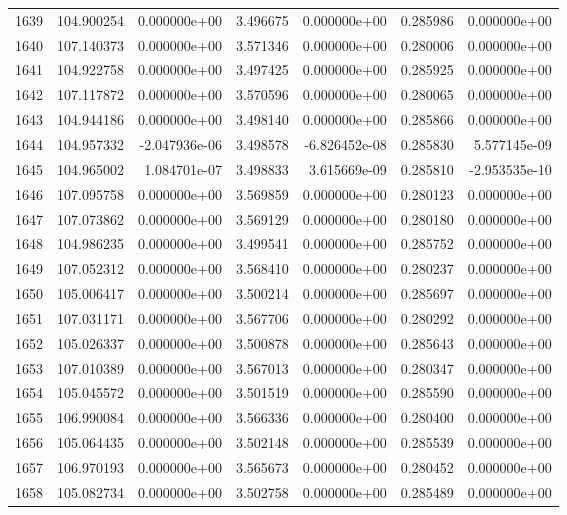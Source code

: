 \begin{tabular}{rrrrrrr}
1639 & 104.900254 &  0.000000e+00 &  3.496675 &  0.000000e+00 &    0.285986 &  0.000000e+00 \\
1640 & 107.140373 &  0.000000e+00 &  3.571346 &  0.000000e+00 &    0.280006 &  0.000000e+00 \\
1641 & 104.922758 &  0.000000e+00 &  3.497425 &  0.000000e+00 &    0.285925 &  0.000000e+00 \\
1642 & 107.117872 &  0.000000e+00 &  3.570596 &  0.000000e+00 &    0.280065 &  0.000000e+00 \\
1643 & 104.944186 &  0.000000e+00 &  3.498140 &  0.000000e+00 &    0.285866 &  0.000000e+00 \\
1644 & 104.957332 & -2.047936e-06 &  3.498578 & -6.826452e-08 &    0.285830 &  5.577145e-09 \\
1645 & 104.965002 &  1.084701e-07 &  3.498833 &  3.615669e-09 &    0.285810 & -2.953535e-10 \\
1646 & 107.095758 &  0.000000e+00 &  3.569859 &  0.000000e+00 &    0.280123 &  0.000000e+00 \\
1647 & 107.073862 &  0.000000e+00 &  3.569129 &  0.000000e+00 &    0.280180 &  0.000000e+00 \\
1648 & 104.986235 &  0.000000e+00 &  3.499541 &  0.000000e+00 &    0.285752 &  0.000000e+00 \\
1649 & 107.052312 &  0.000000e+00 &  3.568410 &  0.000000e+00 &    0.280237 &  0.000000e+00 \\
1650 & 105.006417 &  0.000000e+00 &  3.500214 &  0.000000e+00 &    0.285697 &  0.000000e+00 \\
1651 & 107.031171 &  0.000000e+00 &  3.567706 &  0.000000e+00 &    0.280292 &  0.000000e+00 \\
1652 & 105.026337 &  0.000000e+00 &  3.500878 &  0.000000e+00 &    0.285643 &  0.000000e+00 \\
1653 & 107.010389 &  0.000000e+00 &  3.567013 &  0.000000e+00 &    0.280347 &  0.000000e+00 \\
1654 & 105.045572 &  0.000000e+00 &  3.501519 &  0.000000e+00 &    0.285590 &  0.000000e+00 \\
1655 & 106.990084 &  0.000000e+00 &  3.566336 &  0.000000e+00 &    0.280400 &  0.000000e+00 \\
1656 & 105.064435 &  0.000000e+00 &  3.502148 &  0.000000e+00 &    0.285539 &  0.000000e+00 \\
1657 & 106.970193 &  0.000000e+00 &  3.565673 &  0.000000e+00 &    0.280452 &  0.000000e+00 \\
1658 & 105.082734 &  0.000000e+00 &  3.502758 &  0.000000e+00 &    0.285489 &  0.000000e+00 \\

\end{tabular}
